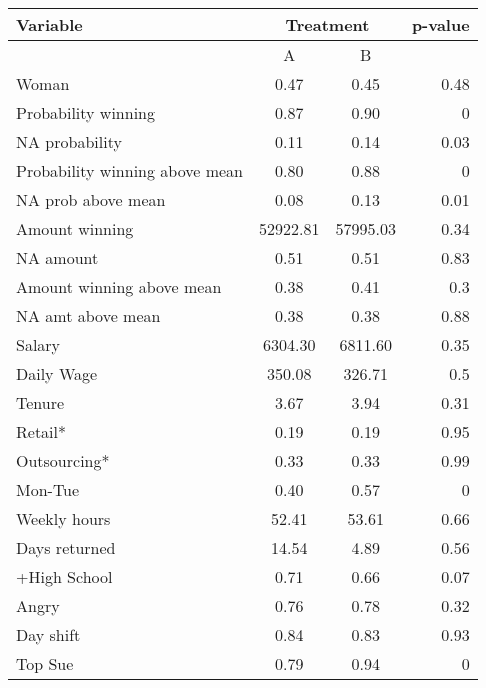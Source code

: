 \begin{tabular}{lccc}
\toprule
Variable & \multicolumn{2}{c}{Treatment} &  p-value \\
\midrule
\midrule
      & A     & B     &  \\
\midrule
Woman & 0.47  & 0.45  & \multicolumn{1}{r}{0.48} \\
Probability winning & 0.87  & 0.90  & \multicolumn{1}{r}{\cellcolor[rgb]{ .816,  .808,  .808} 0} \\
NA probability & 0.11  & 0.14  & \multicolumn{1}{r}{\cellcolor[rgb]{ .816,  .808,  .808} 0.03} \\
Probability winning above mean & 0.80  & 0.88  & \multicolumn{1}{r}{\cellcolor[rgb]{ .816,  .808,  .808} 0} \\
NA prob above mean & 0.08  & 0.13  & \multicolumn{1}{r}{\cellcolor[rgb]{ .816,  .808,  .808} 0.01} \\
Amount winning & 52922.81 & 57995.03 & \multicolumn{1}{r}{0.34} \\
NA amount & 0.51  & 0.51  & \multicolumn{1}{r}{0.83} \\
Amount winning above mean & 0.38  & 0.41  & \multicolumn{1}{r}{0.3} \\
NA amt above mean & 0.38  & 0.38  & \multicolumn{1}{r}{0.88} \\
Salary & 6304.30 & 6811.60 & \multicolumn{1}{r}{0.35} \\
Daily Wage & 350.08 & 326.71 & \multicolumn{1}{r}{0.5} \\
Tenure & 3.67  & 3.94  & \multicolumn{1}{r}{0.31} \\
Retail* & 0.19  & 0.19  & \multicolumn{1}{r}{0.95} \\
Outsourcing* & 0.33  & 0.33  & \multicolumn{1}{r}{0.99} \\
Mon-Tue & 0.40  & 0.57  & \multicolumn{1}{r}{\cellcolor[rgb]{ .816,  .808,  .808} 0} \\
Weekly hours & 52.41 & 53.61 & \multicolumn{1}{r}{0.66} \\
Days returned & 14.54 & 4.89  & \multicolumn{1}{r}{0.56} \\
+High School & 0.71  & 0.66  & \multicolumn{1}{r}{\cellcolor[rgb]{ .816,  .808,  .808} 0.07} \\
Angry & 0.76  & 0.78  & \multicolumn{1}{r}{0.32} \\
Day shift & 0.84  & 0.83  & \multicolumn{1}{r}{0.93} \\
Top Sue & 0.79  & 0.94  & \multicolumn{1}{r}{\cellcolor[rgb]{ .816,  .808,  .808} 0} \\

\end{tabular}

